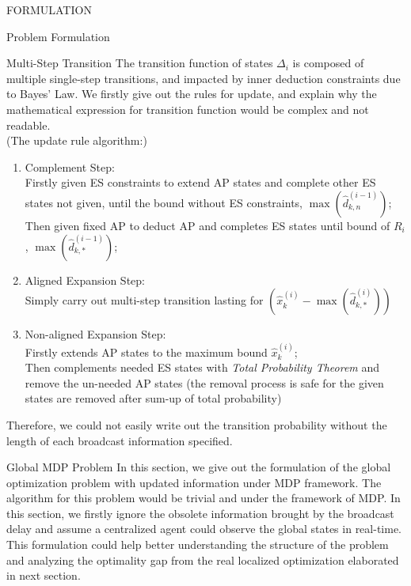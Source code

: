 \documentclass[10pt, conference, letterpaper]{IEEEtran}
\begin{document}
\begin{section}{FORMULATION}
\begin{subsection}{Problem Formulation}
\begin{subsubsection}{Multi-Step Transition}
                The transition function of states $\Delta_i$ is composed of multiple single-step transitions, and impacted by inner deduction constraints due to Bayes' Law. We firstly give out the rules for update, and explain why the mathematical expression for transition function would be complex and not readable.
                \\
                (The update rule algorithm:)
                \begin{enumerate}
                    \item Complement Step: \\
                    Firstly given ES constraints to extend AP states and complete other ES states not given, until the bound without ES constraints, $\max(\hat{d}_{k,n}^{(i-1)})$;\\
                    Then given fixed AP to deduct AP and completes ES states until bound of $R_i$, $\max(\hat{d}^{(i-1)}_{k,*})$;
                    \item Aligned Expansion Step: \\
                    Simply carry out multi-step transition lasting for $( \hat{x}^{(i)}_k - \max(\hat{d}^{(i)}_{k,*}) )$
                    \item Non-aligned Expansion Step: \\
                    Firstly extends AP states to the maximum bound $\hat{x}^{(i)}_k$; \\
                    Then complements needed ES states with \emph{Total Probability Theorem} and remove the un-needed AP states (the removal process is safe for the given states are removed after sum-up of total probability)
                \end{enumerate}
                Therefore, we could not easily write out the transition probability without the length of each broadcast information specified.
            \end{subsubsection}

        \end{subsection}

        \begin{subsection}{Global MDP Problem\*}
            In this section, we give out the formulation of the global optimization problem with updated information under MDP framework. The algorithm for this problem would be trivial and 
            under the framework of MDP. In this section, we firstly ignore the obsolete information brought by the broadcast delay and assume a centralized agent could observe the global states in real-time. This formulation could help better understanding the structure of the problem and analyzing the optimality gap from the real localized optimization elaborated in next section.


\end{subsection}
\end{section}
\end{document}
